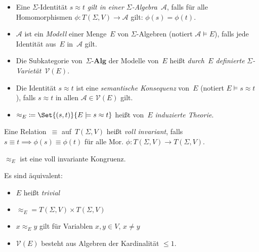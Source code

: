 \documentclass{cheat-sheet}
\newcommand{\ident}{\approx} %
\renewcommand{\Alg}{\mathcal{A}} %
\newcommand{\SigmaAlgC}{\text{$\Sigma$-$\mathbf{Alg}$}} %
\newcommand{\Variety}{\mathcal{V}} %
\begin{document}





\begin{defn}
  \begin{itemize}
    \item Eine $\Sigma$-Identität $s \ident t$ \emph{gilt in einer $\Sigma$-Algebra}~$\Alg$, falls für alle Homomorphismen $\phi : T(\Sigma, V) \to \Alg$ gilt: $\phi(s) = \phi(t)$.
    \item $\Alg$ ist ein \emph{Modell} einer Menge~$E$ von $\Sigma$-Algebren (notiert $\Alg \models E$), falls jede Identität aus~$E$ in~$\Alg$ gilt.
    \item Die Subkategorie von~$\SigmaAlgC$ der Modelle von~$E$ heißt \textit{durch~$E$ definierte} \emph{$\Sigma$-Varietät}~$\Variety(E)$.
  \end{itemize}
\end{defn}

\begin{defn}
  \begin{itemize}
    \item Die Identität $s \ident t$ ist eine \emph{semantische Konsequenz} von~$E$ (notiert $E \models s \ident t$), falls $s \ident t$ in allen $\Alg \in \Variety(E)$ gilt.
    \item ${\ident_E} \coloneqq \Set{(s,t)}{E \models s \approx t}$ heißt von~$E$ \emph{induzierte Theorie}. %
  \end{itemize}
\end{defn}

\begin{defn}
  Eine Relation~$\equiv$ auf~$T(\Sigma, V)$ heißt \emph{voll invariant}, falls $s \equiv t \implies \phi(s) \equiv \phi(t)$ für alle Mor. $\phi : T(\Sigma, V) \to T(\Sigma, V)$.
\end{defn}

\begin{lem}
  $\ident_E$ ist eine voll invariante Kongruenz.
\end{lem}

\begin{lemdefn}
  Es sind äquivalent:
  \begin{itemize}
    \item $E$ heißt \emph{trivial}
    \item $\ident_E = T(\Sigma, V) \times T(\Sigma, V)$
    \item $x \ident_E y$ gilt für Variablen $x, y \in V$, $x \neq y$
    \item $\Variety(E)$ besteht aus Algebren der Kardinalität $\leq 1$.
  \end{itemize}
\end{lemdefn}
\end{document}
